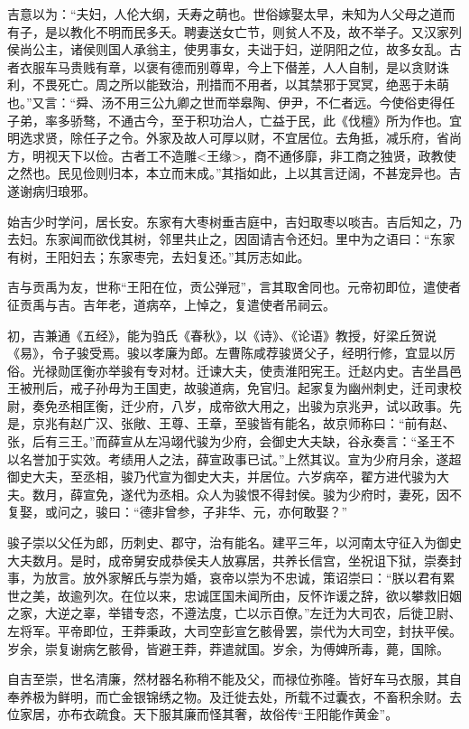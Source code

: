 \documentclass[]{article}
\begin{document}
吉意以为：``夫妇，人伦大纲，夭寿之萌也。世俗嫁娶太早，未知为人父母之道而有子，是以教化不明而民多夭。聘妻送女亡节，则贫人不及，故不举子。又汉家列侯尚公主，诸侯则国人承翁主，使男事女，夫诎于妇，逆阴阳之位，故多女乱。古者衣服车马贵贱有章，以褒有德而别尊卑，今上下僣差，人人自制，是以贪财诛利，不畏死亡。周之所以能致治，刑措而不用者，以其禁邪于冥冥，绝恶于未萌也。''又言：``舜、汤不用三公九卿之世而举皋陶、伊尹，不仁者远。今使俗吏得任子弟，率多骄骜，不通古今，至于积功治人，亡益于民，此《伐檀》所为作也。宜明选求贤，除任子之令。外家及故人可厚以财，不宜居位。去角抵，减乐府，省尚方，明视天下以俭。古者工不造雕\textless{}王缘\textgreater{}，商不通侈靡，非工商之独贤，政教使之然也。民见俭则归本，本立而末成。''其指如此，上以其言迂阔，不甚宠异也。吉遂谢病归琅邪。

始吉少时学问，居长安。东家有大枣树垂吉庭中，吉妇取枣以啖吉。吉后知之，乃去妇。东家闻而欲伐其树，邻里共止之，因固请吉令还妇。里中为之语曰：``东家有树，王阳妇去；东家枣完，去妇复还。''其厉志如此。

吉与贡禹为友，世称``王阳在位，贡公弹冠''，言其取舍同也。元帝初即位，遣使者征贡禹与吉。吉年老，道病卒，上悼之，复遣使者吊祠云。

初，吉兼通《五经》，能为驺氏《春秋》，以《诗》、《论语》教授，好梁丘贺说《易》，令子骏受焉。骏以孝廉为郎。左曹陈咸荐骏贤父子，经明行修，宜显以厉俗。光禄勋匡衡亦举骏有专对材。迁谏大夫，使责淮阳宪王。迁赵内史。吉坐昌邑王被刑后，戒子孙毋为王国吏，故骏道病，免官归。起家复为幽州刺史，迁司隶校尉，奏免丞相匡衡，迁少府，八岁，成帝欲大用之，出骏为京兆尹，试以政事。先是，京兆有赵广汉、张敞、王尊、王章，至骏皆有能名，故京师称曰：``前有赵、张，后有三王。''而薛宣从左冯翊代骏为少府，会御史大夫缺，谷永奏言：``圣王不以名誉加于实效。考绩用人之法，薛宣政事已试。''上然其议。宣为少府月余，遂超御史大夫，至丞相，骏乃代宣为御史大夫，并居位。六岁病卒，翟方进代骏为大夫。数月，薛宣免，遂代为丞相。众人为骏恨不得封侯。骏为少府时，妻死，因不复娶，或问之，骏曰：``德非曾参，子非华、元，亦何敢娶？''

骏子崇以父任为郎，历刺史、郡守，治有能名。建平三年，以河南太守征入为御史大夫数月。是时，成帝舅安成恭侯夫人放寡居，共养长信宫，坐祝诅下狱，崇奏封事，为放言。放外家解氏与崇为婚，哀帝以崇为不忠诚，策诏崇曰：``朕以君有累世之美，故逾列次。在位以来，忠诚匡国未闻所由，反怀诈谖之辞，欲以攀救旧姻之家，大逆之辜，举错专恣，不遵法度，亡以示百僚。''左迁为大司农，后徙卫尉、左将军。平帝即位，王莽秉政，大司空彭宣乞骸骨罢，崇代为大司空，封扶平侯。岁余，崇复谢病乞骸骨，皆避王莽，莽遣就国。岁余，为傅婢所毒，薨，国除。

自吉至崇，世名清廉，然材器名称稍不能及父，而禄位弥隆。皆好车马衣服，其自奉养极为鲜明，而亡金银锦绣之物。及迁徙去处，所载不过囊衣，不畜积余财。去位家居，亦布衣疏食。天下服其廉而怪其奢，故俗传``王阳能作黄金''。
\end{document}
